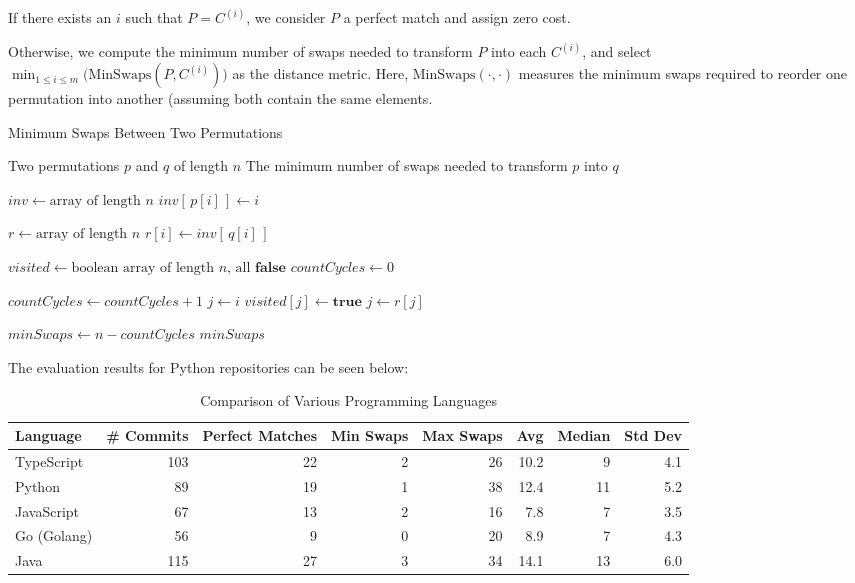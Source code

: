 If there exists an $i$ such that $P = C^{(i)}$, we consider $P$ a perfect match and assign zero cost.

Otherwise, we compute the minimum number of swaps needed to transform $P$ into each $C^{(i)}$, and select 
$\min_{1 \leq i \leq m} \bigl(\mathrm{MinSwaps}(P, C^{(i)})\bigr)$ as the distance metric. Here, $\mathrm{MinSwaps}(\cdot,\cdot)$ measures the minimum swaps required to reorder one permutation into another (assuming both contain the same elements.


\begin{algorithm}[H]
\caption{Minimum Swaps Between Two Permutations}
\label{alg:min-swaps}
\begin{algorithmic}[1]
\Require Two permutations $p$ and $q$ of length $n$
\Ensure The minimum number of swaps needed to transform $p$ into $q$

\Statex

\State \(\textit{inv} \gets \text{array of length } n\)
    \State \(\textit{inv}[\,p[i]\,] \gets i\)
\EndFor

\State \(r \gets \text{array of length } n\)
    \State \(r[i] \gets \textit{inv}[\,q[i]\,]\)
\EndFor

\State \(\textit{visited} \gets \text{boolean array of length } n\text{, all } \textbf{false}\)
\State \(\textit{countCycles} \gets 0\)

        \State \(\textit{countCycles} \gets \textit{countCycles} + 1\)
        \State \(j \gets i\)
            \State \(\textit{visited}[j] \gets \textbf{true}\)
            \State \(j \gets r[j]\)
        \EndWhile
    \EndIf
\EndFor

\State \(\textit{minSwaps} \gets n - \textit{countCycles}\)
\State \Return \(\textit{minSwaps}\)

\end{algorithmic}
\end{algorithm}

The evaluation results for Python repositories can be seen below: 

\begin{table}[h!]
\centering
\caption{Comparison of Various Programming Languages}
\label{tab:language-comparison}
\begin{tabular}{@{}lrrrrrrr@{}}
\toprule
\textbf{Language} & \textbf{\# Commits} & \textbf{Perfect Matches} & \textbf{Min Swaps} & \textbf{Max Swaps} & \textbf{Avg} & \textbf{Median} & \textbf{Std Dev} \\ 
\midrule
TypeScript & 103 & 22 & 2  & 26 & 10.2 & 9  & 4.1 \\
Python     &  89 & 19 & 1  & 38 & 12.4 & 11 & 5.2 \\
JavaScript &  67 & 13 & 2  & 16 &  7.8 & 7  & 3.5 \\
Go (Golang)&  56 &  9 & 0  & 20 &  8.9 & 7  & 4.3 \\
Java       & 115 & 27 & 3  & 34 & 14.1 & 13 & 6.0 \\
\bottomrule
\end{tabular}
\end{table}
